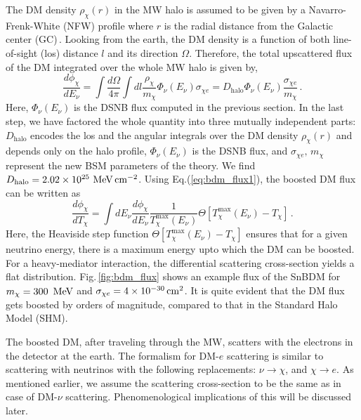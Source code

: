 \documentclass[prd,aps,twocolumn,tightenlines,notitlepage,nofootinbib,preprintnumbers,letterpaper,superscriptaddress]{revtex4-2}
\def\to {\rightarrow}
\newcommand{\sbdm}{SnBDM }
\newcommand{\cmsq}{{\rm\,cm^2}}
\newcommand{\MeV}{{\rm\ MeV}}
\newcommand{\phichi}{\phi_\chi}
\newcommand{\Phinu}{\Phi_\nu(E_\nu)}
\newcommand{\mchi}{m_\chi}
\newcommand{\sce}{\sigma_{\chi e}}
\begin{document}
The DM density $\rho_\chi(r)$ in the MW halo is assumed to be given by a Navarro-Frenk-White (NFW) profile where $r$ is the radial distance from the Galactic center (GC)\,\cite{Navarro_1996}. Looking from the earth, the DM density is a function of both line-of-sight (los) distance $l$ and its direction $\Omega$. Therefore, the total upscattered flux of the DM integrated over the whole MW halo is given by,
\begin{equation}\label{eq:bdm_flux1}
	\frac{d\phichi}{dE_\nu} = \int \frac{d\Omega}{4\pi} \int dl \frac{\rho_\chi}{\mchi} \Phinu \sce = D_\mathrm{halo} \Phi_\nu(E_\nu) \frac{\sce}{\mchi}\,.
\end{equation}
Here, $\Phinu$ is the DSNB flux computed in the previous section. In the last step, we have factored the whole quantity into three mutually independent parts: $D_\mathrm{halo}$ encodes the los and the angular integrals over the DM density $\rho_\chi(r)$ and depends only on the halo profile, $\Phinu$ is the DSNB flux, and $\sce,\,\mchi$ represent the new BSM parameters of the theory. We find $D_\mathrm{halo}=2.02\times 10^{25}\MeV\,\mathrm{cm^{-2}}$.
Using Eq.(\ref{eq:bdm_flux1}), the boosted DM flux can be written as
\begin{equation}\label{eq:bdm_flux2}
	\frac{d\phichi}{dT_\chi} = \int dE_\nu \frac{d\phichi}{dE_\nu} \frac{1}{T_\chi^\mathrm{max}(E_\nu)} \Theta\left[T_\chi^\mathrm{max}(E_\nu)-T_\chi\right]\,.
\end{equation}
Here, the Heaviside step function $\Theta\left[T_\chi^\mathrm{max}(E_\nu)-T_\chi\right]$ ensures that for a given neutrino energy, there is a maximum energy upto which the DM can be boosted. For a heavy-mediator interaction, the differential scattering cross-section yields a flat distribution. Fig.\,\ref{fig:bdm_flux} shows an example flux of the \sbdm for $\mchi=300\,\MeV$ and $\sce=4\times 10^{-30}\cmsq$. It is quite evident that the DM flux gets boosted by orders of magnitude, compared to that in the Standard Halo Model (SHM).


The boosted DM, after traveling through the MW, scatters with the electrons in the detector at the earth. The formalism for DM-$e$ scattering is similar to scattering with neutrinos with the following replacements: $\nu\to\chi$, and  $\chi\to e$. As mentioned earlier, we assume the scattering cross-section to be the same as in case of DM-$\nu$ scattering. Phenomenological implications of this will be discussed later.
\end{document}
